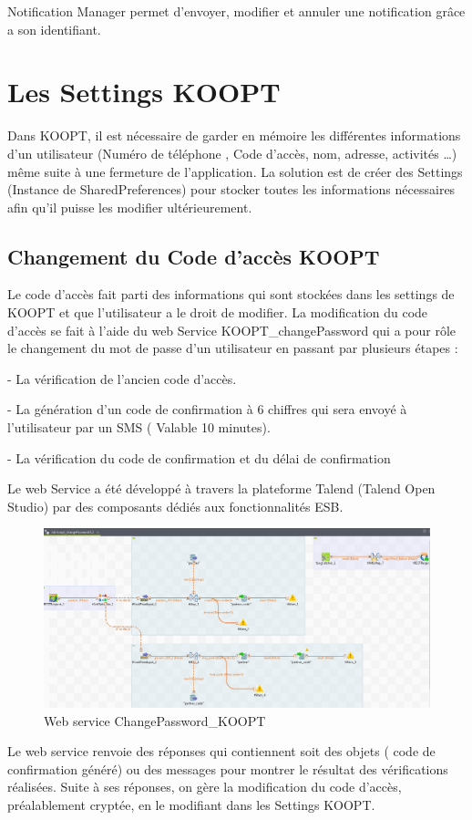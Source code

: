 Notification Manager permet d’envoyer, modifier et annuler une notification grâce a son identifiant.

\section{Les Settings KOOPT  }

Dans KOOPT, il est nécessaire de garder en mémoire les différentes informations d’un utilisateur (Numéro de téléphone , Code d'accès, nom, adresse, activités …) même suite à une fermeture de l’application. La solution est de créer des Settings (Instance de  SharedPreferences) pour stocker toutes les informations nécessaires afin qu’il puisse les modifier ultérieurement.


\subsection{Changement du Code d’accès KOOPT}

Le code d’accès fait parti des informations qui sont stockées dans les settings de KOOPT et que l’utilisateur a le droit de modifier.
La modification du code d’accès se fait à l’aide du web Service KOOPT\_changePassword qui a pour rôle le changement du mot de passe d’un utilisateur en passant par plusieurs étapes : 

- La vérification de l’ancien code d'accès.

- La génération d’un code de confirmation à 6 chiffres qui sera envoyé à l’utilisateur par un SMS ( Valable 10 minutes).

- La vérification du code de confirmation et du délai de confirmation
 
Le web Service a été développé à travers la plateforme Talend (Talend Open Studio) par des composants dédiés aux fonctionnalités ESB.
 
 \begin{figure}[H]
\begin{center}
\includegraphics[width=1\linewidth]{images/webservice}
\end{center}
\caption{Web service ChangePassword\_KOOPT}
\label{fig:18}
\end{figure}
 
Le web service renvoie des réponses qui contiennent soit des objets ( code de confirmation généré) ou des messages pour montrer le résultat des vérifications réalisées. 
Suite à ses réponses, on gère la modification du code d'accès, préalablement cryptée, en le modifiant dans les Settings KOOPT.


